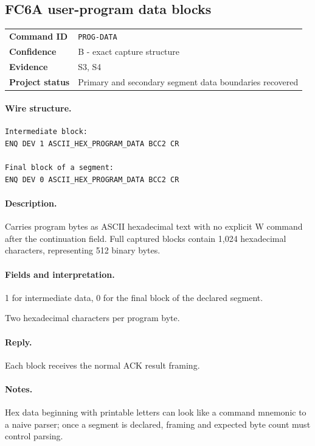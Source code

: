 \documentclass[10pt,letterpaper]{article}
\begin{document}
\subsection{FC6A user-program data blocks}
\begin{tabularx}{\textwidth}{@{}>{\bfseries}p{2.8cm}X@{}}
Command ID & \texttt{PROG-DATA} \\
Confidence & B - exact capture structure \\
Evidence & S3, S4 \\
Project status & Primary and secondary segment data boundaries recovered \\
\end{tabularx}
\vspace{0.35em}
\paragraph{Wire structure.}
\begin{Verbatim}[breaklines=true,breakanywhere=true,fontsize=\small]
Intermediate block:
ENQ DEV 1 ASCII_HEX_PROGRAM_DATA BCC2 CR

Final block of a segment:
ENQ DEV 0 ASCII_HEX_PROGRAM_DATA BCC2 CR
\end{Verbatim}
\paragraph{Description.} Carries program bytes as ASCII hexadecimal text with no explicit W command after the continuation field. Full captured blocks contain 1,024 hexadecimal characters, representing 512 binary bytes.
\paragraph{Fields and interpretation.}
\begin{description}[style=nextline,leftmargin=3.2cm,labelwidth=3.0cm,font=\normalfont\bfseries]
\item[Continuation] 1 for intermediate data, 0 for the final block of the declared segment.
\item[Data] Two hexadecimal characters per program byte.
\end{description}
\paragraph{Reply.} Each block receives the normal ACK result framing.
\paragraph{Notes.} Hex data beginning with printable letters can look like a command mnemonic to a naive parser; once a segment is declared, framing and expected byte count must control parsing.
\end{document}
